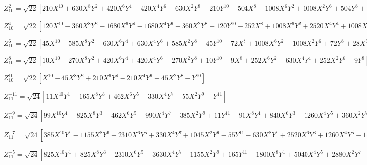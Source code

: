 \documentclass[10pt,landscape]{article}
\begin{document}
\vspace{1.2 mm}
\noindent $ Z^{2}_{10} = \sqrt{22} [210X^{10} +630X^{8}Y^{2} +420X^{6}Y^{4} -420X^{4}Y^{6} -630X^{2}Y^{8} -210Y^{10} -504X^{8} -1008X^{6}Y^{2} +1008X^{2}Y^{6} +504Y^{8} +420X^{6} +420X^{4}Y^{2} -420X^{2}Y^{4} -420Y^{6} -140X^{4} +140Y^{4} +15X^{2} -15Y^{2}] $

\vspace{1.2 mm}
\noindent $ Z^{4}_{10} = \sqrt{22} [120X^{10} -360X^{8}Y^{2} -1680X^{6}Y^{4} -1680X^{4}Y^{6} -360X^{2}Y^{8} +120Y^{10} -252X^{8} +1008X^{6}Y^{2} +2520X^{4}Y^{4} +1008X^{2}Y^{6} -252Y^{8} +168X^{6} -840X^{4}Y^{2} -840X^{2}Y^{4} +168Y^{6} -35X^{4} +210X^{2}Y^{2} -35Y^{4}] $

\vspace{1.2 mm}
\noindent $ Z^{6}_{10} = \sqrt{22} [45X^{10} -585X^{8}Y^{2} -630X^{6}Y^{4} +630X^{4}Y^{6} +585X^{2}Y^{8} -45Y^{10} -72X^{8} +1008X^{6}Y^{2} -1008X^{2}Y^{6} +72Y^{8} +28X^{6} -420X^{4}Y^{2} +420X^{2}Y^{4} -28Y^{6}] $

\vspace{1.2 mm}
\noindent $ Z^{8}_{10} = \sqrt{22} [10X^{10} -270X^{8}Y^{2} +420X^{6}Y^{4} +420X^{4}Y^{6} -270X^{2}Y^{8} +10Y^{10} -9X^{8} +252X^{6}Y^{2} -630X^{4}Y^{4} +252X^{2}Y^{6} -9Y^{8}] $

\vspace{1.2 mm}
\noindent $ Z^{10}_{10} = \sqrt{22} [X^{10} -45X^{8}Y^{2} +210X^{6}Y^{4} -210X^{4}Y^{6} +45X^{2}Y^{8} -Y^{10}] $

\vspace{1.2 mm}
\noindent $ Z^{-11}_{11} = \sqrt{24} [11X^{10}Y^{1} -165X^{8}Y^{3} +462X^{6}Y^{5} -330X^{4}Y^{7} +55X^{2}Y^{9} -Y^{11}] $

\vspace{1.2 mm}
\noindent $ Z^{-9}_{11} = \sqrt{24} [99X^{10}Y^{1} -825X^{8}Y^{3} +462X^{6}Y^{5} +990X^{4}Y^{7} -385X^{2}Y^{9} +11Y^{11} -90X^{8}Y^{1} +840X^{6}Y^{3} -1260X^{4}Y^{5} +360X^{2}Y^{7} -10Y^{9}] $

\vspace{1.2 mm}
\noindent $ Z^{-7}_{11} = \sqrt{24} [385X^{10}Y^{1} -1155X^{8}Y^{3} -2310X^{6}Y^{5} +330X^{4}Y^{7} +1045X^{2}Y^{9} -55Y^{11} -630X^{8}Y^{1} +2520X^{6}Y^{3} +1260X^{4}Y^{5} -1800X^{2}Y^{7} +90Y^{9} +252X^{6}Y^{1} -1260X^{4}Y^{3} +756X^{2}Y^{5} -36Y^{7}] $

\vspace{1.2 mm}
\noindent $ Z^{-5}_{11} = \sqrt{24} [825X^{10}Y^{1} +825X^{8}Y^{3} -2310X^{6}Y^{5} -3630X^{4}Y^{7} -1155X^{2}Y^{9} +165Y^{11} -1800X^{8}Y^{1} +5040X^{4}Y^{5} +2880X^{2}Y^{7} -360Y^{9} +1260X^{6}Y^{1} -1260X^{4}Y^{3} -2268X^{2}Y^{5} +252Y^{7} -280X^{4}Y^{1} +560X^{2}Y^{3} -56Y^{5}] $
\end{document}
